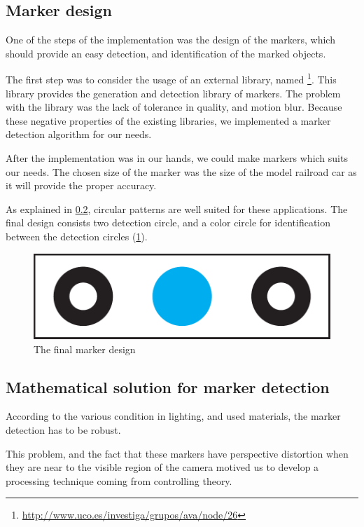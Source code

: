 \subsection{Marker design}

One of the steps of the  implementation was the design of the markers, which should provide an easy detection, and identification of the marked objects.

The first step was to consider the usage of an external library, named \footnote{\url{http://www.uco.es/investiga/grupos/ava/node/26}}. This library provides the generation and detection library of markers. The problem with the library was the lack of tolerance in quality, and motion blur. Because these negative properties of the existing libraries, we implemented a marker detection algorithm for our needs.

After the implementation was in our hands, we could make markers which suits our needs. The chosen size of the marker was the size of the model railroad car as it will provide the proper accuracy.

As explained in \cref{fig:case_study:opencv_math}, circular patterns are well suited for these applications. The final design consists two detection circle, and a color circle for identification between the detection circles (\cref{fig:case_study:final_marker}).

\begin{figure}[h]
	\centering
	\includegraphics[width=0.5\linewidth]{include/figures/chapter_6/opencv_finalmarker}
	\caption{The final marker design}
	\label{fig:case_study:final_marker} 
\end{figure}

\subsection{Mathematical solution for marker detection}
\label{fig:case_study:opencv_math}


According to the various condition in lighting, and used materials, the marker detection has to be robust.

This problem, and the fact that these markers have perspective distortion when they are near to the visible region of the camera motived us to develop a processing technique coming from controlling theory.


